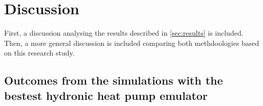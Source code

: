\begin{comment}
\begin{figure}
  \texttt{[image: boptest/Fig7.eps]}
\caption{Indoor zone temperature through the simulation for the baseline, the MPC and program synthesis in typical heat period, together with the lower and upper comfort limits and temperature setpoint for baseline controller.}
\label{fig:7}       %
\end{figure}
%


The evolution in the thermal discomfort corresponds to this cumulative thermal discomfort along the simulation, depicted in Figure \ref{fig:8}.

\begin{figure}
\texttt{[image: boptest/Fig8.eps]}
\caption{Thermal discomfort for the baseline and the three MPC scenarios in the typical heat day simulation.}
\label{fig:8}       %
\end{figure}
%

The performance of the MPC compared to the baseline for the second objective, which is the reduction is cost, is reflected in Figure \ref{fig:9} which depicts the energy cost accross the simulation.

\begin{figure}
  \texttt{[image: boptest/Fig9.eps]}
\caption{Evolution of the energy cost for the baseline and MPC with different electricity price schemes for a typical heat day week.}
\label{fig:9}       %
\end{figure}
\end{comment}

\section{Discussion}
\label{sec:discussion}
First, a discussion analysing the results described in \ref{sec:results} is included. Then, a more general discussion is included comparing both methdoologies based on this research study.

\subsection{Outcomes from the simulations with the bestest hydronic heat pump emulator}


